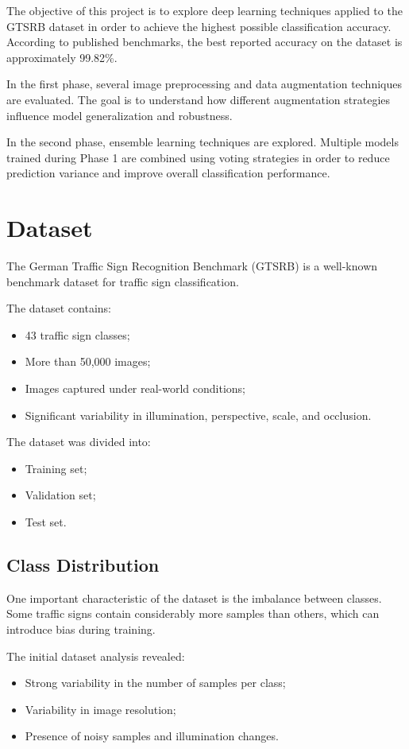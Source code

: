\documentclass[conference,a4paper]{IEEEtran}
\begin{document}
The objective of this project is to explore deep learning techniques applied to the GTSRB dataset in order to achieve the highest possible classification accuracy. According to published benchmarks, the best reported accuracy on the dataset is approximately 99.82\%.

In the first phase, several image preprocessing and data augmentation techniques are evaluated. The goal is to understand how different augmentation strategies influence model generalization and robustness.

In the second phase, ensemble learning techniques are explored. Multiple models trained during Phase 1 are combined using voting strategies in order to reduce prediction variance and improve overall classification performance.

\section{Dataset}

The German Traffic Sign Recognition Benchmark (GTSRB) is a well-known benchmark dataset for traffic sign classification.

The dataset contains:
\begin{itemize}
    \item 43 traffic sign classes;
    \item More than 50,000 images;
    \item Images captured under real-world conditions;
    \item Significant variability in illumination, perspective, scale, and occlusion.
\end{itemize}

The dataset was divided into:
\begin{itemize}
    \item Training set;
    \item Validation set;
    \item Test set.
\end{itemize}

\subsection{Class Distribution}

One important characteristic of the dataset is the imbalance between classes. Some traffic signs contain considerably more samples than others, which can introduce bias during training.

The initial dataset analysis revealed:
\begin{itemize}
    \item Strong variability in the number of samples per class;
    \item Variability in image resolution;
    \item Presence of noisy samples and illumination changes.
\end{itemize}
\end{document}
